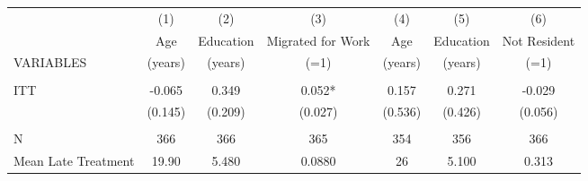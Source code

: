 \begin{tabular}{lcccccc} \hline
 & (1) & (2) & (3) & (4) & (5) & (6) \\
 & Age & Education & Migrated for Work & Age & Education & Not Resident \\
VARIABLES & (years) & (years) & (=1) & (years) & (years) & (=1) \\ \hline
 &  &  &  &  &  &  \\
ITT & -0.065 & 0.349 & 0.052* & 0.157 & 0.271 & -0.029 \\
 & (0.145) & (0.209) & (0.027) & (0.536) & (0.426) & (0.056) \\
 &  &  &  &  &  &  \\
N & 366 & 366 & 365 & 354 & 356 & 366 \\
 Mean Late Treatment & 19.90 & 5.480 & 0.0880 & 26 & 5.100 & 0.313 \\ \hline
\end{tabular}
